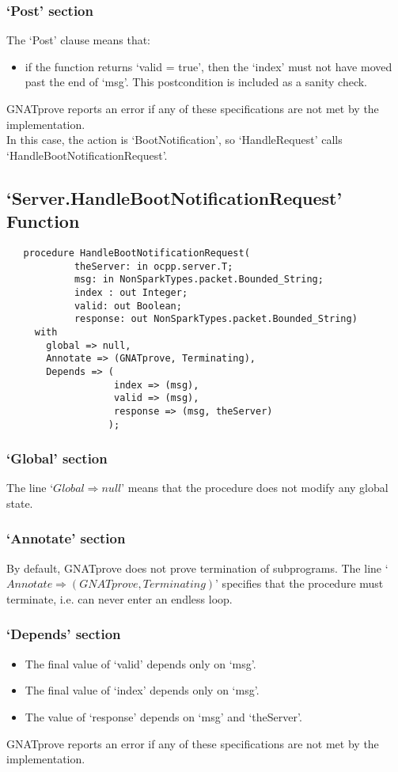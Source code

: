 \documentclass[12pt,openany,a4paper]{book}
\begin{document}
\subsubsection{`Post' section}
The `Post' clause means that:
\begin{itemize}
\item if the function returns `valid = true', then the `index' must not have moved past the end of `msg'. This postcondition is included as a sanity check. 
\end{itemize}

GNATprove reports an error if any of these specifications are not met by the implementation.\\

In this case, the action is `BootNotification', so `HandleRequest' calls `HandleBootNotificationRequest'.






\subsection{`Server.HandleBootNotificationRequest' Function}
\begin{verbatim}
   procedure HandleBootNotificationRequest(
   			theServer: in ocpp.server.T;
            msg: in NonSparkTypes.packet.Bounded_String;
            index : out Integer;
            valid: out Boolean;
            response: out NonSparkTypes.packet.Bounded_String)
     with
       global => null,
       Annotate => (GNATprove, Terminating),
       Depends => (
                   index => (msg),
                   valid => (msg),
                   response => (msg, theServer)
                  );
\end{verbatim}
\subsubsection{`Global' section}
The line `$Global \Rightarrow null$' means that the procedure does not modify any global state.
\subsubsection{`Annotate' section}
By default, GNATprove does not prove termination of subprograms. The line `$Annotate \Rightarrow (GNATprove, Terminating)$' specifies that the procedure must terminate, i.e. can never enter an endless loop. 
\subsubsection{`Depends' section}
\begin{itemize}
\item The final value of `valid' depends only on `msg'.
\item The final value of `index' depends only on `msg'.
\item The value of `response' depends on `msg' and `theServer'. 
\end{itemize}
GNATprove reports an error if any of these specifications are not met by the implementation.\\
\end{document}
